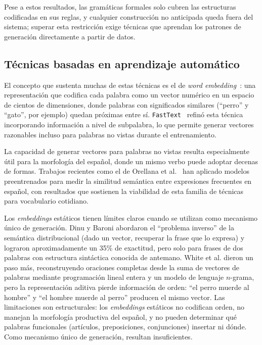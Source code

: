 Pese a estos resultados, las gramáticas formales solo cubren las estructuras codificadas en sus reglas, y cualquier construcción no anticipada queda fuera del sistema; superar esta restricción exige técnicas que aprendan los patrones de generación directamente a partir de datos.

\subsection{Técnicas basadas en aprendizaje automático}

El concepto que sustenta muchas de estas técnicas es el de \textit{word embedding}~\cite{mikolov2013word2vec}: una representación que codifica cada palabra como un vector numérico en un espacio de cientos de dimensiones, donde palabras con significados similares (``perro'' y ``gato'', por ejemplo) quedan próximas entre sí. \texttt{FastText}~\cite{bojanowski2017fasttext} refinó esta técnica incorporando información a nivel de subpalabra, lo que permite generar vectores razonables incluso para palabras no vistas durante el entrenamiento.

La capacidad de generar vectores para palabras no vistas resulta especialmente útil para la morfología del español, donde un mismo verbo puede adoptar decenas de formas. Trabajos recientes como el de Orellana et al.~\cite{orellana2024semantic} han aplicado modelos preentrenados para medir la similitud semántica entre expresiones frecuentes en español, con resultados que sostienen la viabilidad de esta familia de técnicas para vocabulario cotidiano.

Los \textit{embeddings} estáticos tienen límites claros cuando se utilizan como mecanismo único de generación. Dinu y Baroni abordaron el ``problema inverso'' de la semántica distribucional (dado un vector, recuperar la frase que lo expresa) y lograron aproximadamente un 35\% de exactitud, pero solo para frases de dos palabras con estructura sintáctica conocida de antemano. White et al. dieron un paso más, reconstruyendo oraciones completas desde la suma de vectores de palabras mediante programación lineal entera y un modelo de lenguaje $n$-grama, pero la representación aditiva pierde información de orden: ``el perro muerde al hombre'' y ``el hombre muerde al perro'' producen el mismo vector. Las limitaciones son estructurales: los \textit{embeddings} estáticos no codifican orden, no manejan la morfología productiva del español, y no pueden determinar qué palabras funcionales (artículos, preposiciones, conjunciones) insertar ni dónde. Como mecanismo único de generación, resultan insuficientes.


